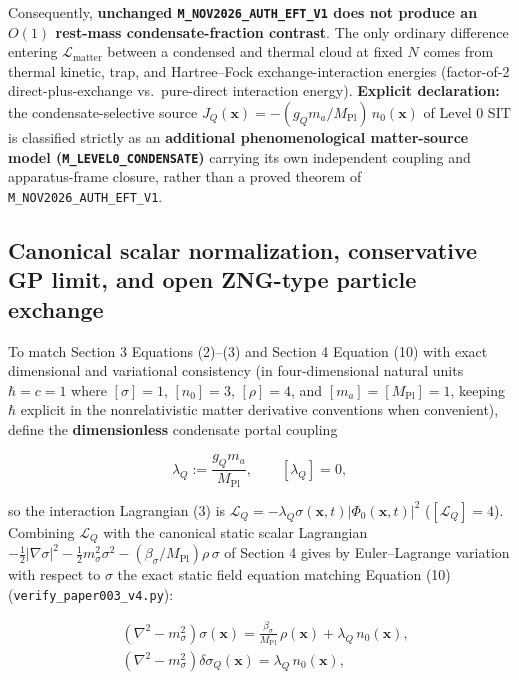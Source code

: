 \documentclass[
  american,
  11pt,
  letterpaper,
]{article}
\begin{document}
Consequently, \textbf{unchanged \nolinkurl{M_NOV2026_AUTH_EFT_V1} does not produce an \(O(1)\) rest-mass condensate-fraction contrast}. The only ordinary difference entering \(\mathcal{L}_{\mathrm{matter}}\) between a condensed and thermal cloud at fixed \(N\) comes from thermal kinetic, trap, and Hartree--Fock exchange-interaction energies (factor-of-2 direct-plus-exchange vs.~pure-direct interaction energy). \textbf{Explicit declaration:} the condensate-selective source \(J_Q(\mathbf{x}) = -(g_Q m_a / M_{\mathrm{Pl}})\,n_0(\mathbf{x})\) of Level 0 SIT is classified strictly as an \textbf{additional phenomenological matter-source model (\nolinkurl{M_LEVEL0_CONDENSATE})} carrying its own independent coupling and apparatus-frame closure, rather than a proved theorem of \nolinkurl{M_NOV2026_AUTH_EFT_V1}.

\subsection{Canonical scalar normalization, conservative GP limit, and open ZNG-type particle exchange}\label{canonical-scalar-normalization-conservative-gp-limit-and-open-zng-type-particle-exchange}

To match Section 3 Equations (2)--(3) and Section 4 Equation (10) with exact dimensional and variational consistency (in four-dimensional natural units \(\hbar = c = 1\) where \([\sigma] = 1\), \([n_0] = 3\), \([\rho] = 4\), and \([m_a] = [M_{\mathrm{Pl}}] = 1\), keeping \(\hbar\) explicit in the nonrelativistic matter derivative conventions when convenient), define the \textbf{dimensionless} condensate portal coupling

\begin{equation}
\lambda_Q := \frac{g_Q m_a}{M_{\mathrm{Pl}}}, \qquad [\lambda_Q] = 0,
\end{equation}

so the interaction Lagrangian (3) is \(\mathcal{L}_Q = -\lambda_Q \sigma(\mathbf{x}, t) |\Phi_0(\mathbf{x}, t)|^2\) (\([\mathcal{L}_Q] = 4\)). Combining \(\mathcal{L}_Q\) with the canonical static scalar Lagrangian \(-\frac{1}{2}|\nabla\sigma|^2 - \frac{1}{2}m_\sigma^2\sigma^2 - (\beta_\sigma / M_{\mathrm{Pl}})\rho\,\sigma\) of Section 4 gives by Euler--Lagrange variation with respect to \(\sigma\) the exact static field equation matching Equation (10) (\nolinkurl{verify_paper003_v4.py}):

\begin{equation}
\begin{aligned}
& (\nabla^2 - m_\sigma^2)\sigma(\mathbf{x}) = \frac{\beta_\sigma}{M_{\mathrm{Pl}}}\,\rho(\mathbf{x}) + \lambda_Q\,n_0(\mathbf{x}), \\
& (\nabla^2 - m_\sigma^2)\delta\sigma_Q(\mathbf{x}) = \lambda_Q\,n_0(\mathbf{x}),
\end{aligned}
\end{equation}
\end{document}

